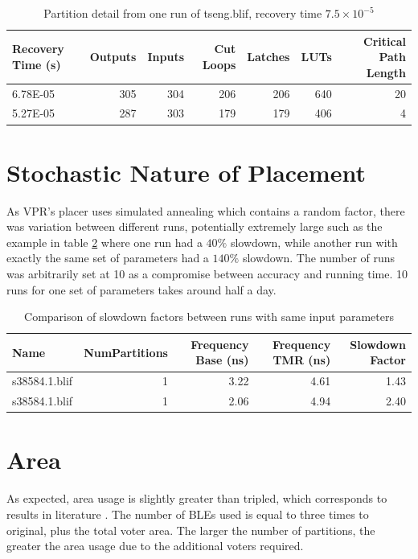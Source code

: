 \documentclass[12pt,final,oneside]{dwThesis} %
\begin{document}
      \begin{table}
   	\begin{tabular}{lrrrrrr}
   	\toprule
Recovery Time (s) & Outputs & Inputs & Cut Loops & Latches & \acp{LUT} & Critical Path Length\\
   		\midrule
6.78E-05 & 305 & 304 & 206 & 206 & 640 & 20\\
5.27E-05 & 287 & 303 & 179 & 179 & 406 & 4\\
\bottomrule
   	\end{tabular}
   	\caption{Partition detail from one run of tseng.blif, recovery time $7.5\times10^{-5}$}\label{tabSanityPartitions}
   \end{table}

   \section{Stochastic Nature of Placement}
   As \ac{VPR}'s placer uses simulated annealing which contains a random factor, there was variation between different runs, potentially extremely large such as the example in table \ref{tabStochastic} where one run had a $40\%$ slowdown, while another run with exactly the same set of parameters had a $140\%$ slowdown.
   The number of runs was arbitrarily set at 10 as a compromise between accuracy and running time. 10 runs for one set of parameters takes around half a day.
   \begin{table}
   	\begin{tabular}{lrrrr}
   	\toprule
   		Name & NumPartitions & Frequency Base (ns) & Frequency TMR (ns) & Slowdown Factor\\
   		\midrule
s38584.1.blif &	1 & 3.22 & 4.61 & 1.43\\
s38584.1.blif &	1 & 2.06 & 4.94 & 2.40\\
\bottomrule
   	\end{tabular}
   	\caption{Comparison of slowdown factors between runs with same input parameters}\label{tabStochastic}
   \end{table}

   \section{Area}
   As expected, area usage is slightly greater than tripled, which corresponds to results in literature \cite{HardeningTechniques}. The number of \acp{BLE} used is equal to three times to original, plus the total voter area. The larger the number of partitions, the greater the area usage due to the additional voters required.
\end{document}
